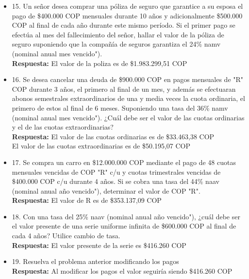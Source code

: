 \begin{itemize}
 \item 15. Un señor desea comprar una póliza de seguro que garantice a su esposa el pago de \$400.000 COP mensuales durante 10 años y adicionalmente \$500.000 COP al final de cada año durante este mismo período. Si el primer pago se efectúa al mes del fallecimiento del señor, hallar el valor de la póliza de seguro suponiendo que la compañía de seguros garantiza el 24\%  namv (nominal anual mes vencido").\\
      \textbf{Respuesta:} El valor de la poliza es de \$1.983.299,51 COP\\
       \medskip

 \item 16. Se desea cancelar una deuda de \$900.000 COP en pagos mensuales de "R" COP durante 3 años, el primero al final de un mes, y además se efectuaran abonos semestrales extraordinarios de una y media veces la cuota ordinaria, el primero de estos al final de 6 meses. Suponiendo una tasa del 36\% namv (nominal anual mes vencido"). ¿Cuál debe ser el valor de las cuotas ordinarias y el de las cuotas extraordinarias?\\
       \textbf{Respuesta:} El valor de las cuotas ordinarias es de \$33.463,38 COP\\ 
       El valor de las cuotas extraordinarias es de \$50.195,07 COP\\
       \medskip

 \item 17. Se compra un carro en \$12.000.000 COP mediante el pago de 48 cuotas mensuales vencidas de  COP "R" c/u y cuotas trimestrales vencidas de \$400.000 COP c/u durante 4 años. Si se cobra una tasa del 44\% naav (nominal anual año vencido"), determinar el valor de  COP "R".\\
       \textbf{Respuesta:} El valor de R es de \$353.137,09 COP\\
       \medskip

 \item 18. Con una tasa del 25\% naav (nominal anual año vencido"), ¿cuál debe ser el valor presente de una serie uniforme infinita de \$600.000 COP al final de cada 4 años? Utilice cambio de tasa.\\
       \textbf{Respuesta:} El valor presente de la serie es \$416.260 COP\\
       \medskip

 \item 19. Resuelva el problema anterior modificando los pagos\\
       \textbf{Respuesta:} Al modificar los pagos el valor seguiría siendo \$416.260 COP\\
       \medskip


\end{itemize}

